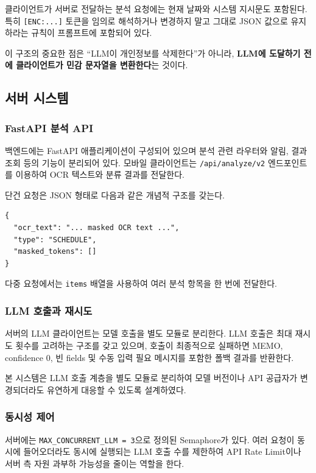\documentclass[11pt,a4paper]{article}
\begin{document}
클라이언트가 서버로 전달하는 분석 요청에는 현재 날짜와 시스템 지시문도 포함된다. 특히 \texttt{[ENC:...]} 토큰을 임의로 해석하거나 변경하지 말고 그대로 JSON 값으로 유지하라는 규칙이 프롬프트에 포함되어 있다.

이 구조의 중요한 점은 ``LLM이 개인정보를 삭제한다''가 아니라, \textbf{LLM에 도달하기 전에 클라이언트가 민감 문자열을 변환한다}는 것이다.

\subsection{서버 시스템}

\subsubsection{FastAPI 분석 API}

백엔드에는 FastAPI 애플리케이션이 구성되어 있으며 분석 관련 라우터와 알림, 결과 조회 등의 기능이 분리되어 있다. 모바일 클라이언트는 \texttt{/api/analyze/v2} 엔드포인트를 이용하여 OCR 텍스트와 분류 결과를 전달한다.

단건 요청은 JSON 형태로 다음과 같은 개념적 구조를 갖는다.

\begin{lstlisting}
{
  "ocr_text": "... masked OCR text ...",
  "type": "SCHEDULE",
  "masked_tokens": []
}
\end{lstlisting}

다중 요청에서는 \texttt{items} 배열을 사용하여 여러 분석 항목을 한 번에 전달한다.

\subsubsection{LLM 호출과 재시도}

서버의 LLM 클라이언트는 모델 호출을 별도 모듈로 분리한다. LLM 호출은 최대 재시도 횟수를 고려하는 구조를 갖고 있으며, 호출이 최종적으로 실패하면 MEMO, confidence 0, 빈 fields 및 수동 입력 필요 메시지를 포함한 폴백 결과를 반환한다.

본 시스템은 LLM 호출 계층을 별도 모듈로 분리하여 모델 버전이나 API 공급자가 변경되더라도 유연하게 대응할 수 있도록 설계하였다.

\subsubsection{동시성 제어}

서버에는 \texttt{MAX\_CONCURRENT\_LLM = 3}으로 정의된 Semaphore가 있다. 여러 요청이 동시에 들어오더라도 동시에 실행되는 LLM 호출 수를 제한하여 API Rate Limit이나 서버 측 자원 과부하 가능성을 줄이는 역할을 한다.
\end{document}
